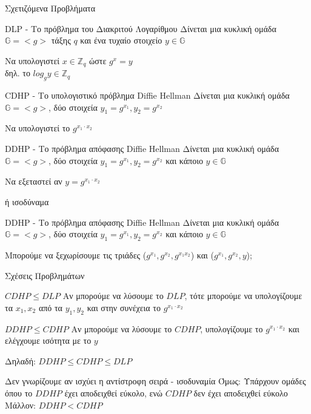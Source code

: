 \documentclass[handout]{beamer}
\begin{document}
\begin{frame}[allowframebreaks]{Σχετιζόμενα Προβλήματα}

\begin{block}{DLP - Το πρόβλημα του Διακριτού Λογαρίθμου}
Δίνεται μια κυκλική ομάδα $\mathbb{G}=<g>$ τάξης $q$ και ένα τυχαίο στοιχείο $y \in \mathbb{G}$

Να υπολογιστεί $x \in \mathbb{Z}_q$ ώστε $g^x = y$ \\
δηλ. το $log_g y \in \mathbb{Z}_q$
\end{block}

\framebreak

\begin{block}{CDHP - Το υπολογιστικό πρόβλημα Diffie Hellman}
Δίνεται μια κυκλική ομάδα $\mathbb{G}=<g>$, δύο στοιχεία $y_1=g^{x_1}, y_2 = g^{x_2}$

Να υπολογιστεί το $g^{x_1 \cdot x_2}$ 
\end{block}


\framebreak
{}

\begin{block}{DDHP - Το πρόβλημα απόφασης Diffie Hellman}
Δίνεται μια κυκλική  ομάδα $\mathbb{G}=<g>$, δύο στοιχεία $y_1=g^{x_1}, y_2 = g^{x_2}$ και κάποιο  $y \in \mathbb{G}$ 

Να εξεταστεί αν  $y = g^{x_1 \cdot x_2}$ 
\end{block}
ή ισοδύναμα
\begin{block}{DDHP - Το πρόβλημα απόφασης Diffie Hellman}
Δίνεται μια κυκλική  ομάδα $\mathbb{G}=<g>$, δύο στοιχεία $y_1=g^{x_1}, y_2 = g^{x_2}$ και κάποιο  $y \in \mathbb{G}$ 

Μπορούμε να ξεχωρίσουμε τις τριάδες ($g^{x_1}, g^{x_2}, g^{x_1x_2}$) και  ($g^{x_1}, g^{x_2}, y$);
\end{block}
\end{frame}

\begin{frame}{Σχέσεις Προβλημάτων}
\begin{block}{$CDHP \leq DLP$}
Αν μπορούμε να λύσουμε το $DLP$, τότε μπορούμε να υπολογίζουμε τα $x_1, x_2$ από τα $y_1, y_2$ και στην συνέχεια το $g^{x_1 \cdot x_2}$
\end{block}

\pause
 
\begin{block}{$DDHP \leq CDHP$}
Αν μπορούμε να λύσουμε το $CDHP$, υπολογίζουμε το $g^{x_1 \cdot x_2}$ και ελέγχουμε ισότητα με το $y$
\end{block}
 
\pause 
Δηλαδή: $DDHP \leq CDHP \leq DLP$

\alert{Δεν γνωρίζουμε αν ισχύει η αντίστροφη σειρά - ισοδυναμία}
\alert{Όμως:}
Υπάρχουν ομάδες όπου το $DDHP$ έχει αποδειχθεί εύκολο, ενώ $CDHP$ δεν έχει αποδειχθεί εύκολο\\
\alert{Μάλλον:} $DDHP < CDHP$
\end{frame}
\end{document}
